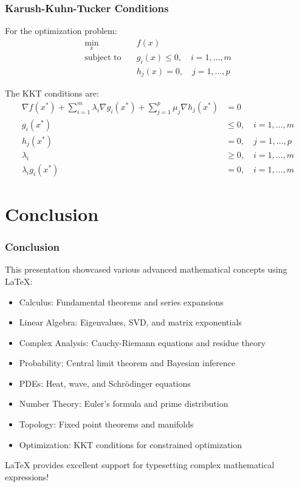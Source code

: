 \documentclass{beamer}
\begin{document}
\begin{frame}
\frametitle{Karush-Kuhn-Tucker Conditions}
For the optimization problem:
\begin{align}
\min_{x} \quad & f(x) \\
\text{subject to} \quad & g_i(x) \leq 0, \quad i = 1, \ldots, m \\
& h_j(x) = 0, \quad j = 1, \ldots, p
\end{align}

The KKT conditions are:
\begin{align}
\nabla f(x^*) + \sum_{i=1}^{m} \lambda_i \nabla g_i(x^*) + \sum_{j=1}^{p} \mu_j \nabla h_j(x^*) &= 0 \\
g_i(x^*) &\leq 0, \quad i = 1, \ldots, m \\
h_j(x^*) &= 0, \quad j = 1, \ldots, p \\
\lambda_i &\geq 0, \quad i = 1, \ldots, m \\
\lambda_i g_i(x^*) &= 0, \quad i = 1, \ldots, m
\end{align}
\end{frame}

\section{Conclusion}

\begin{frame}
\frametitle{Conclusion}
This presentation showcased various advanced mathematical concepts using LaTeX:

\begin{itemize}
\item Calculus: Fundamental theorems and series expansions
\item Linear Algebra: Eigenvalues, SVD, and matrix exponentials
\item Complex Analysis: Cauchy-Riemann equations and residue theory
\item Probability: Central limit theorem and Bayesian inference
\item PDEs: Heat, wave, and Schrödinger equations
\item Number Theory: Euler's formula and prime distribution
\item Topology: Fixed point theorems and manifolds
\item Optimization: KKT conditions for constrained optimization
\end{itemize}

LaTeX provides excellent support for typesetting complex mathematical expressions!
\end{frame}
\end{document}
